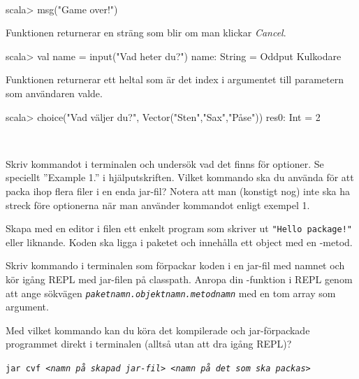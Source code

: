 \SOLUTION

\TaskSolved \what~

\SubtaskSolved
\begin{REPL}
scala> msg("Game over!")
\end{REPL}

\SubtaskSolved Funktionen  returnerar en sträng som blir  om man klickar \emph{Cancel}.
\begin{REPL}
scala> val name = input("Vad heter du?")
name: String = Oddput Kulkodare
\end{REPL}

\SubtaskSolved Funktionen  returnerar ett heltal som är det index i argumentet till parametern  som användaren valde.
\begin{REPL}
scala> choice("Vad väljer du?", Vector("Sten","Sax","Påse"))
res0: Int = 2
\end{REPL}

\QUESTEND





\QUESTBEGIN

\Task  \what~

\Subtask Skriv kommandot  i terminalen och undersök vad det finns för optioner. Se speciellt ''Example 1.'' i hjälputskriften. Vilket kommando ska du använda för att packa ihop flera filer i en enda jar-fil? Notera att man (konstigt nog) inte ska ha streck före optionerna när man använder kommandot  enligt exempel 1.

\Subtask Skapa med en editor i filen  ett enkelt program som skriver ut \texttt{"Hello package!"} eller liknande. Koden ska ligga i paketet  och innehålla ett object  med en -metod.

\Subtask Skriv kommando i terminalen som förpackar koden i en jar-fil med namnet  och kör igång REPL med jar-filen på classpath. Anropa din -funktion i REPL genom att ange sökvägen \textit{\texttt{paketnamn.objektnamn.metodnamn}} med en tom array som argument.

\Subtask Med vilket kommando kan du köra det kompilerade och jar-förpackade programmet direkt i terminalen (alltså utan att dra igång REPL)?

\SOLUTION

\TaskSolved \what

\SubtaskSolved

\texttt{jar cvf \textit{<namn på skapad jar-fil> <namn på det som ska packas>}}

